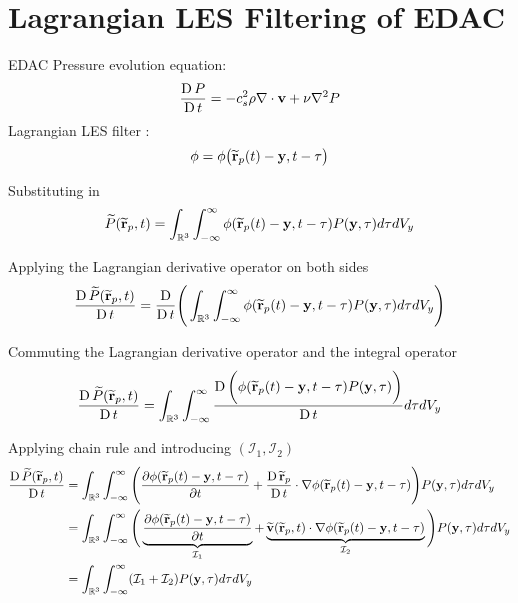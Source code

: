 
\chapter{Lagrangian LES Filtering of EDAC} %

\label{appendix:lagrangian-les-filtering-of-edac} %
EDAC Pressure evolution equation:
\begin{equation}
    \LagDerivative{P} = -c_s^2 \rho \nabla \cdot \vect{v} + \nu \nabla^2 P
    \label{eq:P-evolution}
\end{equation}
Lagrangian LES filter \parencite{DiMascio2017}:
\begin{equation}
    \phi = \phi\big(\TildeR_p(t)-\vect{y}, t-\tau  \big)
    \label{eq:lag-les-filter}
\end{equation}

Substituting  in 
\begin{equation}
     \widetilde{P}(\widetilde{\mathbf{r}}_p, t) = \int_{\mathbb{R}^3} \int_{-\infty}^{\infty} \phi (\widetilde{\mathbf{r}}_p(t)-\mathbf{y}, t-\tau) P(\mathbf{y}, \tau) d \tau d V_y
\end{equation}

Applying the Lagrangian derivative operator on both sides
\begin{equation}
     \frac{\operatorname{D} \widetilde{P}(\widetilde{\mathbf{r}}_p, t)}{\operatorname{D} t} = \frac{\operatorname{D} }{\operatorname{D} t} \Bigg( \int_{\mathbb{R}^3} \int_{-\infty}^{\infty} \phi (\widetilde{\mathbf{r}}_p(t)-\mathbf{y}, t-\tau) P(\mathbf{y}, \tau) d \tau d V_y \Bigg)
\end{equation}

Commuting the Lagrangian derivative operator and the integral operator
\begin{equation}
    \frac{\operatorname{D} \widetilde{P}(\widetilde{\mathbf{r}}_p, t)}{\operatorname{D} t} = \int_{\mathbb{R}^3} \int_{-\infty}^{\infty} \frac{\operatorname{D} \bigg(\phi (\widetilde{\mathbf{r}}_p(t)-\mathbf{y}, t-\tau) P(\mathbf{y}, \tau)\bigg)}{\operatorname{D} t} d \tau d V_y
\end{equation}

Applying chain rule and introducing $(\mathcal{I}_1, \mathcal{I}_2)$
\begin{equation}
    \begin{split}
        \LagDerivative{\TilePArgRp} & = \IntRThreeAndT \Bigg( \PartialDerivative{\PhiRY} + \LagDerivative{\TildeR_p} \cdot \nabla \PhiRY \Bigg) \PY \IntD \\
        & = \IntRThreeAndT \Bigg( \underbrace{\PartialDerivative{\PhiRY}}_{\mathcal{I}_1} + \underbrace{\TildeVArgRp \cdot \nabla \PhiRY}_{\mathcal{I}_2} \Bigg) \PY \IntD \\
        & = \IntRThreeAndT (\mathcal{I}_1 + \mathcal{I}_2) \PY \IntD
    \end{split}
    \label{eq:integral-phi-complex}
\end{equation}


